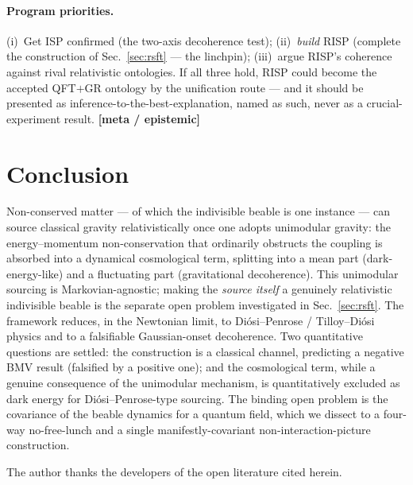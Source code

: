 \documentclass[aps,prd,preprint,amsmath,amssymb,nofootinbib,superscriptaddress]{revtex4-2}
\begin{document}
\paragraph{Program priorities.} (i)~Get ISP confirmed (the two-axis decoherence test); (ii)~\emph{build}
RISP (complete the construction of Sec.~\ref{sec:rsft} --- the linchpin); (iii)~argue RISP's coherence
against rival relativistic ontologies. If all three hold, RISP could become the accepted QFT$+$GR
ontology by the unification route --- and it should be presented as inference-to-the-best-explanation,
named as such, never as a crucial-experiment result. \textbf{[meta / epistemic]}

\section{Conclusion}

Non-conserved matter --- of which the indivisible beable is one instance --- can source classical
gravity relativistically once one adopts unimodular gravity: the energy--momentum non-conservation
that ordinarily obstructs the coupling is absorbed into a dynamical cosmological term, splitting
into a mean part (dark-energy-like) and a fluctuating part (gravitational decoherence). This
unimodular sourcing is Markovian-agnostic; making the \emph{source itself} a genuinely relativistic
indivisible beable is the separate open problem investigated in Sec.~\ref{sec:rsft}. The framework reduces, in the Newtonian limit, to
Di\'osi--Penrose / Tilloy--Di\'osi physics and to a falsifiable Gaussian-onset decoherence. Two
quantitative questions are settled: the construction is a classical channel, predicting a negative
BMV result (falsified by a positive one); and the cosmological term, while a genuine consequence
of the unimodular mechanism, is quantitatively excluded as dark energy for Di\'osi--Penrose-type
sourcing. The binding open problem is the covariance of the beable dynamics for a quantum field,
which we dissect to a four-way no-free-lunch and a single manifestly-covariant non-interaction-picture
construction.

\begin{acknowledgments}
The author thanks the developers of the open literature cited herein.
\end{acknowledgments}
\end{document}
